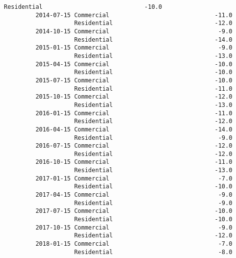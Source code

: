 \documentclass[11pt]{article}
\begin{document}
\begin{Verbatim}[commandchars=\\\{\}]
                    Residential                             -10.0   
         2014-07-15 Commercial                              -11.0   
                    Residential                             -12.0   
         2014-10-15 Commercial                               -9.0   
                    Residential                             -14.0   
         2015-01-15 Commercial                               -9.0   
                    Residential                             -13.0   
         2015-04-15 Commercial                              -10.0   
                    Residential                             -10.0   
         2015-07-15 Commercial                              -10.0   
                    Residential                             -11.0   
         2015-10-15 Commercial                              -12.0   
                    Residential                             -13.0   
         2016-01-15 Commercial                              -11.0   
                    Residential                             -12.0   
         2016-04-15 Commercial                              -14.0   
                    Residential                              -9.0   
         2016-07-15 Commercial                              -12.0   
                    Residential                             -12.0   
         2016-10-15 Commercial                              -11.0   
                    Residential                             -13.0   
         2017-01-15 Commercial                               -7.0   
                    Residential                             -10.0   
         2017-04-15 Commercial                               -9.0   
                    Residential                              -9.0   
         2017-07-15 Commercial                              -10.0   
                    Residential                             -10.0   
         2017-10-15 Commercial                               -9.0   
                    Residential                             -12.0   
         2018-01-15 Commercial                               -7.0   
                    Residential                              -8.0   
         

\end{Verbatim}
\end{document}
